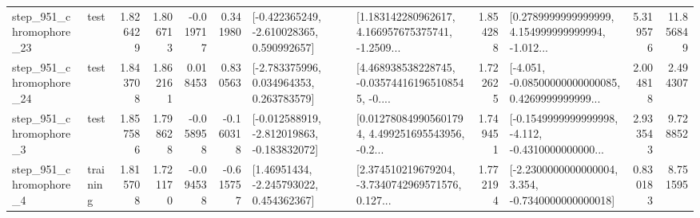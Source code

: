 \begin{tabular}{llrrrrllrlrr}
  step\_951\_chromophore\_23 &      test &      1.826429 &    1.806713 &     -0.019717 &  0.341980 &   [-0.422365249, -2.610028365, 0.590992657] &  [1.183142280962617, 4.166957675375741, -1.2509... &       1.854288 &  [0.2789999999999999, 4.154999999999994, -1.012... &            5.319576 &         11.856849 \\
  step\_951\_chromophore\_24 &      test &      1.843708 &    1.862161 &      0.018453 &  0.830563 &    [-2.783375996, 0.034964353, 0.263783579] &  [4.468938538228745, -0.035744161965108545, -0.... &       1.722625 &  [-4.051, -0.08500000000000085, 0.4269999999999... &            2.004818 &          2.494307 \\
   step\_951\_chromophore\_3 &      test &      1.857586 &    1.798628 &     -0.058958 & -0.160318 &  [-0.012588919, -2.812019863, -0.183832072] &  [0.012780849905601794, 4.499251695543956, -0.2... &       1.749451 &  [-0.1549999999999998, -4.112, -0.4310000000000... &            2.933543 &          9.728852 \\
   step\_951\_chromophore\_4 &  training &      1.815708 &    1.721170 &     -0.094538 & -0.615757 &     [1.46951434, -2.245793022, 0.454362367] &  [2.374510219679204, -3.7340742969571576, 0.127... &       1.772194 &  [-2.2300000000000004, 3.354, -0.7340000000000018] &            0.830183 &          8.751595 \\
\bottomrule
\end{tabular}

